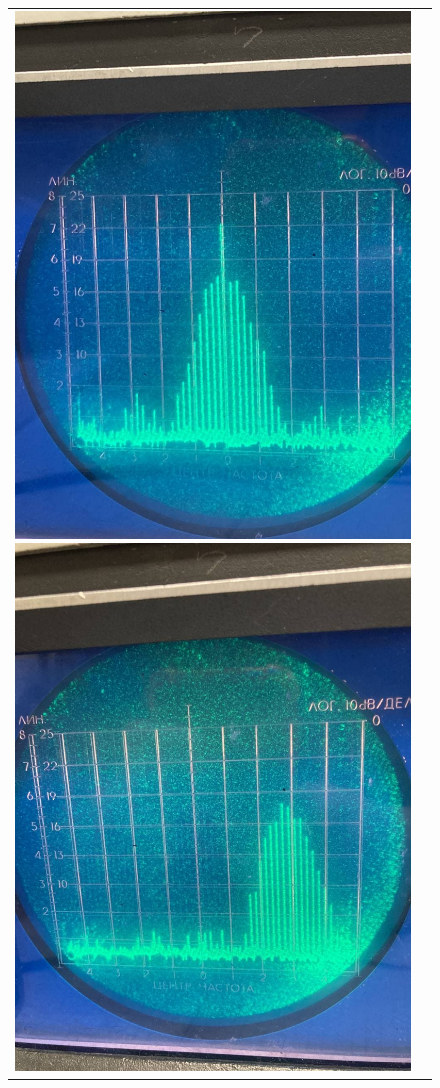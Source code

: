 \documentclass[a4paper, fontsize = 14pt]{article}
\begin{document}
\begin{figure}[hbt]
\begin{tabular}{cc}
\includegraphics[scale=0.25]{lab361ris6.png}
\includegraphics[scale=0.25]{lab361ris7.png}

\end{tabular}
\end{figure}
\end{document}
